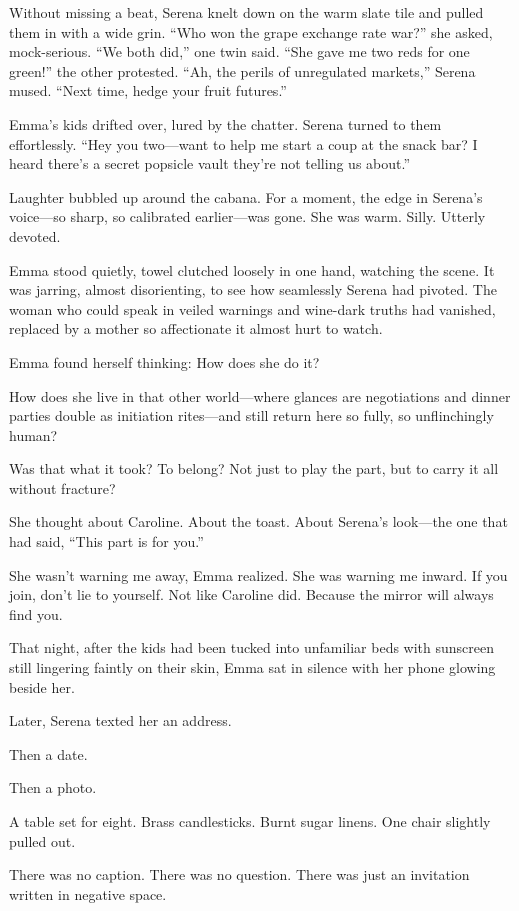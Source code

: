 Without missing a beat, Serena knelt down on the warm slate tile and pulled them in with a wide grin.
“Who won the grape exchange rate war?” she asked, mock-serious.
“We both did,” one twin said.
“She gave me two reds for one green!” the other protested.
“Ah, the perils of unregulated markets,” Serena mused. “Next time, hedge your fruit futures.”

Emma’s kids drifted over, lured by the chatter. Serena turned to them effortlessly.
“Hey you two—want to help me start a coup at the snack bar? I heard there’s a secret popsicle vault they’re not telling us about.”

Laughter bubbled up around the cabana. For a moment, the edge in Serena’s voice—so sharp, so calibrated earlier—was gone. She was warm. Silly. Utterly devoted.

Emma stood quietly, towel clutched loosely in one hand, watching the scene.
It was jarring, almost disorienting, to see how seamlessly Serena had pivoted.
The woman who could speak in veiled warnings and wine-dark truths had vanished, replaced by a mother so affectionate it almost hurt to watch.

Emma found herself thinking: How does she do it?

How does she live in that other world—where glances are negotiations and dinner parties double as initiation rites—and still return here so fully, so unflinchingly human?

Was that what it took? To belong?
Not just to play the part, but to carry it all without fracture?

She thought about Caroline. About the toast.
About Serena’s look—the one that had said, “This part is for you.”

She wasn’t warning me away, Emma realized.
She was warning me inward.
If you join, don’t lie to yourself. Not like Caroline did. Because the mirror will always find you.

That night, after the kids had been tucked into unfamiliar beds with sunscreen still lingering faintly on their skin, Emma sat in silence with her phone glowing beside her.

Later, Serena texted her an address.

Then a date.

Then a photo.

A table set for eight. Brass candlesticks. Burnt sugar linens.
One chair slightly pulled out.

There was no caption.
There was no question.
There was just an invitation written in negative space.

